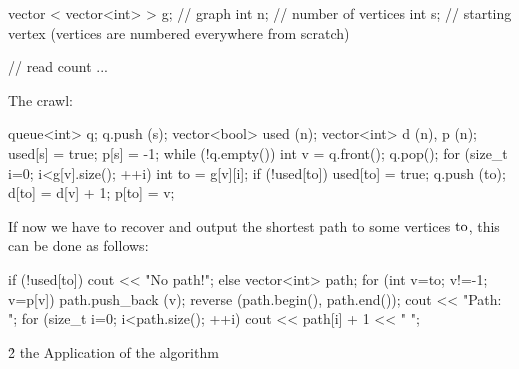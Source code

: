 \code

vector < vector<int> > g; // graph
int n; // number of vertices
int s; // starting vertex (vertices are numbered everywhere from scratch)

// read count
...
\endcode

The crawl:

\code

queue<int> q;
q.push (s);
vector<bool> used (n);
vector<int> d (n), p (n);
used[s] = true;
p[s] = -1;
while (!q.empty()) {
int v = q.front();
q.pop();
for (size_t i=0; i<g[v].size(); ++i) {
int to = g[v][i];
if (!used[to]) {
used[to] = true;
q.push (to);
d[to] = d[v] + 1;
p[to] = v;
}
}
}
\endcode

If now we have to recover and output the shortest path to some vertices $\rm to$, this can be done as follows:

\code

if (!used[to])
cout << "No path!";
else {
vector<int> path;
for (int v=to; v!=-1; v=p[v])
path.push_back (v);
reverse (path.begin(), path.end());
cout << "Path: ";
for (size_t i=0; i<path.size(); ++i)
cout << path[i] + 1 << " ";
}
\endcode


\h2{ the Application of the algorithm }

